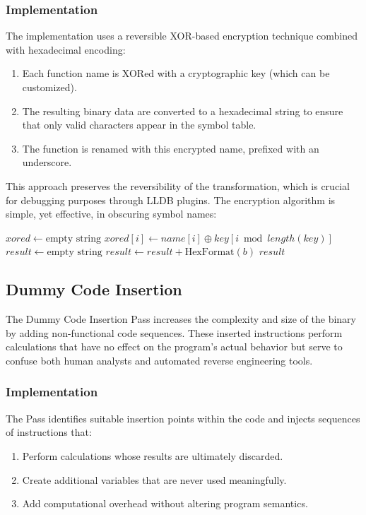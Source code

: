 \documentclass[conference]{IEEEtran}
\begin{document}
\subsubsection{Implementation}
The implementation uses a reversible XOR-based encryption technique combined with hexadecimal encoding:

\begin{enumerate}
    \item Each function name is XORed with a cryptographic key (which can be customized).
    \item The resulting binary data are converted to a hexadecimal string to ensure that only valid characters appear in the symbol table.
    \item The function is renamed with this encrypted name, prefixed with an underscore.
\end{enumerate}

This approach preserves the reversibility of the transformation, which is crucial for debugging purposes through LLDB plugins. The encryption algorithm is simple, yet effective, in obscuring symbol names:

\begin{algorithm}[H]
\caption{Function Name Encryption}
\begin{algorithmic}[1]
    \State $xored \gets \text{empty string}$
        \State $xored[i] \gets name[i] \oplus key[i \bmod length(key)]$
    \EndFor
    \State $result \gets \text{empty string}$
        \State $result \gets result + \text{HexFormat}(b)$ 
    \EndFor
    \State \Return $result$
\EndFunction
\end{algorithmic}
\end{algorithm}

\subsection{Dummy Code Insertion}
The Dummy Code Insertion Pass increases the complexity and size of the binary by adding non-functional code sequences. These inserted instructions perform calculations that have no effect on the program's actual behavior but serve to confuse both human analysts and automated reverse engineering tools.

\subsubsection{Implementation}
The Pass identifies suitable insertion points within the code and injects sequences of instructions that:
\begin{enumerate}
    \item Perform calculations whose results are ultimately discarded.
    \item Create additional variables that are never used meaningfully.
    \item Add computational overhead without altering program semantics.
\end{enumerate}
\end{document}
